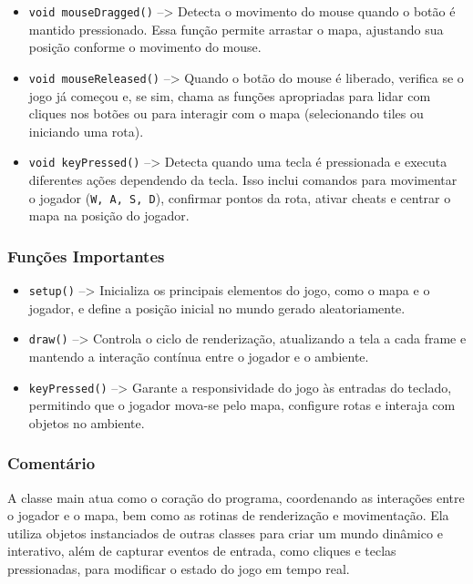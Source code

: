 \documentclass[
	12pt,				%
	oneside,			%
	a4paper,			%
	english,			%
	brazil,				%
	]{abntex2}
\begin{document}
{\begin{itemize}
    \item \texttt{void mouseDragged()} --> Detecta o movimento do mouse quando o botão é mantido pressionado. Essa função permite arrastar o mapa, ajustando sua posição conforme o movimento do mouse.

    \item \texttt{void mouseReleased()} --> Quando o botão do mouse é liberado, verifica se o jogo já começou e, se sim, chama as funções apropriadas para lidar com cliques nos botões ou para interagir com o mapa (selecionando tiles ou iniciando uma rota).

    \item \texttt{void keyPressed()} --> Detecta quando uma tecla é pressionada e executa diferentes ações dependendo da tecla. Isso inclui comandos para movimentar o jogador (\texttt{W, A, S, D}), confirmar pontos da rota, ativar cheats e centrar o mapa na posição do jogador.
\end{itemize}

\subsubsection{Funções Importantes}

\begin{itemize}
    \item \texttt{setup()} --> Inicializa os principais elementos do jogo, como o mapa e o jogador, e define a posição inicial no mundo gerado aleatoriamente.
    
    \item \texttt{draw()} --> Controla o ciclo de renderização, atualizando a tela a cada frame e mantendo a interação contínua entre o jogador e o ambiente.

    \item \texttt{keyPressed()} --> Garante a responsividade do jogo às entradas do teclado, permitindo que o jogador mova-se pelo mapa, configure rotas e interaja com objetos no ambiente.
\end{itemize}

\subsubsection{Comentário}

A classe main atua como o coração do programa, coordenando as interações entre o jogador e o mapa, bem como as rotinas de renderização e movimentação. Ela utiliza objetos instanciados de outras classes para criar um mundo dinâmico e interativo, além de capturar eventos de entrada, como cliques e teclas pressionadas, para modificar o estado do jogo em tempo real.

}
\end{document}
